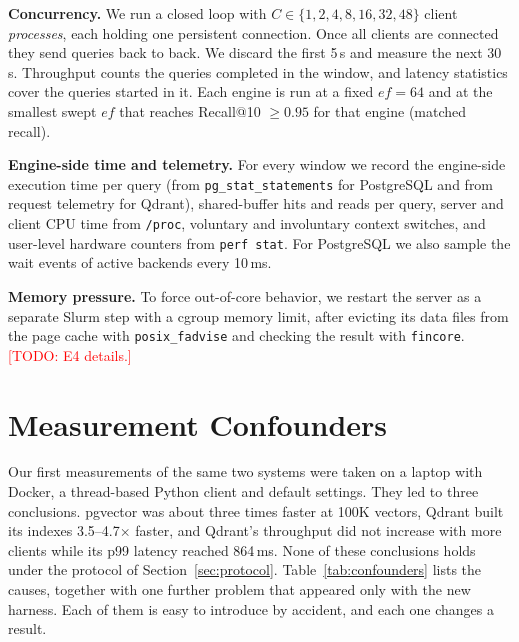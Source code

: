\documentclass[sigconf, nonacm]{acmart}
\newcommand{\todo}[1]{\textcolor{red}{[TODO: #1]}}
\newcommand{\todo}[1]{\errmessage{Unresolved TODO: #1}}
\begin{document}
\textbf{Concurrency.} We run a closed loop with $C\in\{1,2,4,8,16,32,48\}$ client
\emph{processes}, each holding one persistent connection. Once all clients are
connected they send queries back to back. We discard the first 5\,s and measure the next
30\,s. Throughput counts the queries completed in the window, and latency statistics
cover the queries started in it. Each engine is run at a fixed $ef=64$ and at the
smallest swept $ef$ that reaches Recall@10 $\geq 0.95$ for that engine (matched recall).

\textbf{Engine-side time and telemetry.} For every window we record the engine-side
execution time per query (from \texttt{pg\_stat\_statements} for PostgreSQL and from
request telemetry for Qdrant), shared-buffer hits and reads per query, server and client
CPU time from \texttt{/proc}, voluntary and involuntary context switches, and user-level
hardware counters from \texttt{perf stat}. For PostgreSQL we also sample the wait events
of active backends every 10\,ms.

\textbf{Memory pressure.} To force out-of-core behavior, we restart the server as a
separate Slurm step with a cgroup memory limit, after evicting its data files from the
page cache with \texttt{posix\_fadvise} and checking the result with \texttt{fincore}.
\todo{E4 details.}

\section{Measurement Confounders}
\label{sec:confounders}

Our first measurements of the same two systems were taken on a laptop with Docker, a
thread-based Python client and default settings. They led to three conclusions. pgvector
was about three times faster at 100K vectors, Qdrant built its indexes 3.5--4.7$\times$
faster, and Qdrant's throughput did not increase with more clients while its p99 latency
reached 864\,ms. None of these conclusions holds under the protocol of
Section~\ref{sec:protocol}. Table~\ref{tab:confounders} lists the causes, together with
one further problem that appeared only with the new harness. Each of them is easy to
introduce by accident, and each one changes a result.
\end{document}
